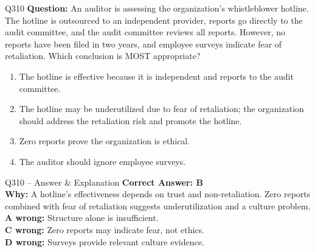 \documentclass[aspectratio=169,10pt]{beamer}
\begin{document}
	\begin{frame}[t]{Q310}
		\small
		\textbf{Question:} An auditor is assessing the organization's whistleblower hotline. The hotline is outsourced to an independent provider, reports go directly to the audit committee, and the audit committee reviews all reports. However, no reports have been filed in two years, and employee surveys indicate fear of retaliation. Which conclusion is MOST appropriate?
		\begin{enumerate}[label=\Alph*.,itemsep=1pt,topsep=2pt]
			\item The hotline is effective because it is independent and reports to the audit committee.
			\item The hotline may be underutilized due to fear of retaliation; the organization should address the retaliation risk and promote the hotline.
			\item Zero reports prove the organization is ethical.
			\item The auditor should ignore employee surveys.
		\end{enumerate}
	\end{frame}
	
	\begin{frame}[t]{Q310 -- Answer \& Explanation}
		\small
		\textbf{Correct Answer: B} \\[4pt]
		\textbf{Why:} A hotline's effectiveness depends on trust and non-retaliation. Zero reports combined with fear of retaliation suggests underutilization and a culture problem. \\[4pt]
		\textbf{A wrong:} Structure alone is insufficient. \\[2pt]
		\textbf{C wrong:} Zero reports may indicate fear, not ethics. \\[2pt]
		\textbf{D wrong:} Surveys provide relevant culture evidence.
	\end{frame}
	
\end{document}
